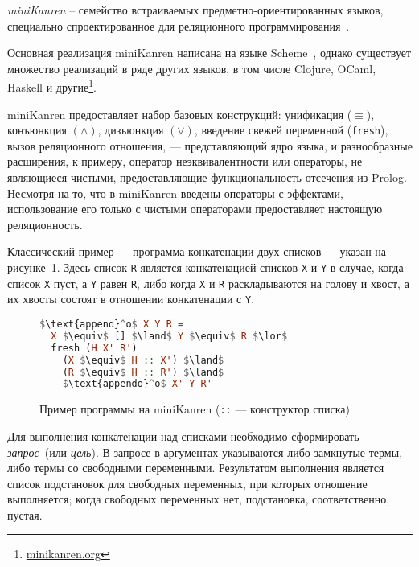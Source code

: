 {\it miniKanren} -- семейство встраиваемых предметно-ориентированных языков,
специально спроектированное для реляционного программирования~\cite{byrdMK}.

Основная реализация miniKanren написана на языке Scheme~\cite{reasonedSchemer},
однако существует множество реализаций в ряде других языков, в том числе
Clojure, OCaml, Haskell и другие\footnote{\url{minikanren.org}}.

miniKanren предоставляет набор базовых конструкций: унификация ($\equiv$),
конъюнкция $(\land)$, дизъюнкция $(\lor)$, введение свежей переменной
(\lstinline{fresh}), вызов реляционного отношения,
--- представляющий ядро языка, и разнообразные расширения, к примеру, оператор неэквивалентности
 или операторы, не являющиеся чистыми, предоставляющие функциональность
отсечения из Prolog. Несмотря на то, что в miniKanren введены операторы с эффектами, использование
его только с чистыми операторами предоставляет настоящую реляционность.

Классический пример --- программа конкатенации двух списков --- указан
на рисунке~\ref{fig:appendo}.
Здесь список \lstinline{R} является конкатенацией списков \lstinline{X} и
\lstinline{Y} в случае, когда список \lstinline{X} пуст, а \lstinline{Y}
равен \lstinline{R}, либо когда \lstinline{X} и \lstinline{R} раскладываются
на голову и хвост, а их хвосты состоят в отношении конкатенации с \lstinline{Y}.

\begin{figure}[h!]
\begin{lstlisting}[mathescape,language=Haskell,extendedchars=\true,frame=single,basicstyle=\ttfamily]
$\text{append}^o$ X Y R =
  X $\equiv$ [] $\land$ Y $\equiv$ R $\lor$
  fresh (H X' R')
    (X $\equiv$ H :: X') $\land$
    (R $\equiv$ H :: R') $\land$
    $\text{appendo}^o$ X' Y R'
\end{lstlisting}

\caption{Пример программы на miniKanren (\lstinline{::} --- конструктор списка)}
\label{fig:appendo}
\end{figure}

Для выполнения конкатенации над списками необходимо сформировать
\emph{запрос}~(или \emph{цель}).
В запросе в аргументах указываются либо замкнутые термы, либо термы
со свободными переменными. Результатом выполнения является список
подстановок для свободных переменных, при которых отношение выполняется;
когда свободных переменных нет, подстановка, соответственно, пустая.

